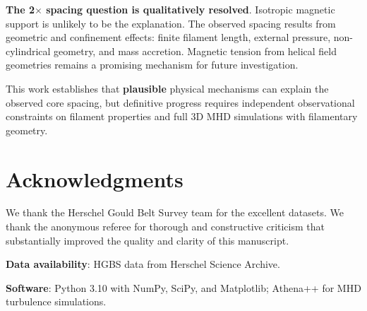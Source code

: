 \documentclass[11pt,a4paper]{article}
\begin{document}
\textbf{The 2$\times$ spacing question is qualitatively resolved}. Isotropic magnetic support is unlikely to be the explanation. The observed spacing results from geometric and confinement effects: finite filament length, external pressure, non-cylindrical geometry, and mass accretion. Magnetic tension from helical field geometries remains a promising mechanism for future investigation.

This work establishes that \textbf{plausible} physical mechanisms can explain the observed core spacing, but definitive progress requires independent observational constraints on filament properties and full 3D MHD simulations with filamentary geometry.

\section*{Acknowledgments}

We thank the Herschel Gould Belt Survey team for the excellent datasets. We thank the anonymous referee for thorough and constructive criticism that substantially improved the quality and clarity of this manuscript.

\textbf{Data availability}: HGBS data from Herschel Science Archive.

\textbf{Software}: Python 3.10 with NumPy, SciPy, and Matplotlib; Athena++ \citep{Stone2020} for MHD turbulence simulations.



\end{document}
